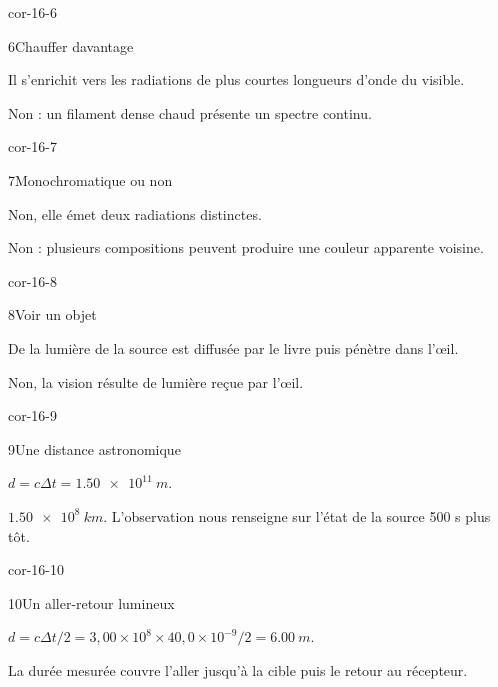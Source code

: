 \begin{blocLivre}{cor-16-6}\begin{corrige}{6}{Chauffer davantage}
\begin{questions}
\item Il s’enrichit vers les radiations de plus courtes longueurs d’onde du visible.
\item Non : un filament dense chaud présente un spectre continu.
\end{questions}
\end{corrige}\end{blocLivre}
\begin{blocLivre}{cor-16-7}\begin{corrige}{7}{Monochromatique ou non}
\begin{questions}
\item Non, elle émet deux radiations distinctes.
\item Non : plusieurs compositions peuvent produire une couleur apparente voisine.
\end{questions}
\end{corrige}\end{blocLivre}
\begin{blocLivre}{cor-16-8}\begin{corrige}{8}{Voir un objet}
\begin{questions}
\item De la lumière de la source est diffusée par le livre puis pénètre dans l’œil.
\item Non, la vision résulte de lumière reçue par l’œil.
\end{questions}
\end{corrige}\end{blocLivre}
\begin{blocLivre}{cor-16-9}\begin{corrige}{9}{Une distance astronomique}
\begin{questions}
\item $d=c\Delta t=\qty{1,50e11}{m}$.
\item $\qty{1,50e8}{km}$. L’observation nous renseigne sur l’état de la source 500 s plus tôt.
\end{questions}
\end{corrige}\end{blocLivre}
\begin{blocLivre}{cor-16-10}\begin{corrige}{10}{Un aller-retour lumineux}
\begin{questions}
\item $d=c\Delta t/2=3,00\times10^8\times40,0\times10^{-9}/2=\qty{6,00}{m}$.
\item La durée mesurée couvre l’aller jusqu’à la cible puis le retour au récepteur.
\end{questions}
\end{corrige}\end{blocLivre}
